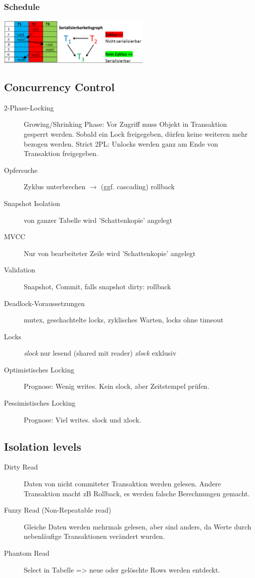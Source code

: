 \begin{multicols*}{3}
\newcommand{\ta}[2]{{\color{blue}#1_{1}#2}}
\newcommand{\tb}[2]{{\color{red}#1_{2}#2}}
\newcommand{\tc}[2]{{\color{green}#1_{3}#2}}

\subsubsection{Schedule}
\includegraphics[width=20em]{serial.png}

\subsection{Concurrency Control}

\begin{description}
\item[2-Phase-Locking]{Growing/Shrinking Phase: Vor Zugriff muss Objekt in Transaktion gesperrt werden. Sobald ein Lock freigegeben, dürfen keine weiteren mehr bezogen werden. Strict 2PL: Unlocks werden ganz am Ende von Transaktion freigegeben.}
\item[Opfersuche]{Zyklus unterbrechen $\rightarrow$ (ggf. cascading) rollback}
\item[Snapshot Isolation] von ganzer Tabelle wird 'Schattenkopie' angelegt
\item[MVCC]{Nur von bearbeiteter Zeile wird 'Schattenkopie' angelegt}
\item[Validation]{Snapshot, Commit, falls snapshot dirty: rollback}
\item[Deadlock-Voraussetzungen] mutex, geschachtelte locks, zyklisches Warten, locks ohne timeout
\item[Locks] \emph{slock} nur lesend (shared mit reader) \emph{xlock} exklusiv
\item[Optimistisches Locking] Prognose: Wenig writes. Kein slock, aber Zeitstempel prüfen.
\item[Pessimistisches Locking] Prognose: Viel writes. slock und xlock.
\end{description}

\subsection{Isolation levels}

\begin{description}
    \item[Dirty Read] Daten von nicht commiteter Transaktion werden gelesen. Andere Transaktion macht zB Rollback, es werden falsche Berechnungen gemacht.
    \item[Fuzzy Read (Non-Repeatable read)] Gleiche Daten werden mehrmals gelesen, aber sind anders, da Werte durch nebenläufige Transaktionen verändert wurden.
    \item[Phantom Read] Select in Tabelle => neue oder gelöschte Rows werden entdeckt.
\end{description}


\end{multicols*}
